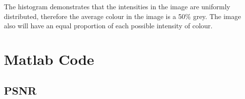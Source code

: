 \documentclass[article, 1.5space, letterpaper, 12pt, oneside, header, footer]{SydeClass}
\begin{document}
The histogram demonstrates that the intensities in the image are uniformly distributed, therefore the average colour in the image is a 50\% grey. The image also will have an equal proportion of each possible intensity of colour.

\appendix
\newpage

\section{Matlab Code}
\subsection{PSNR}
\label{code-PSNR}




\end{document}
